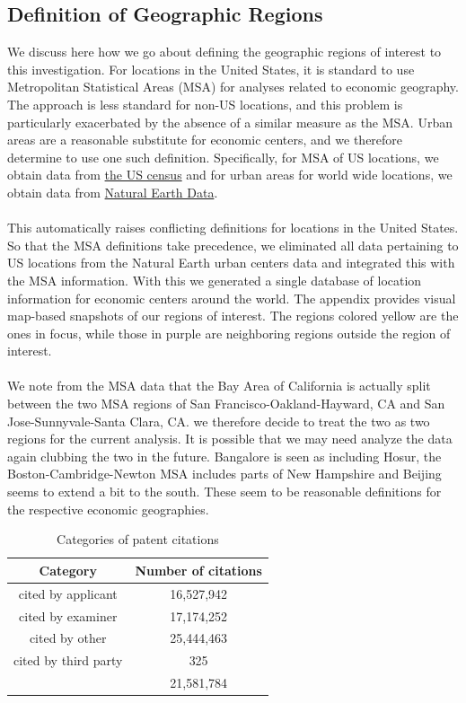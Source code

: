 \documentclass[12pt]{article}
\begin{document}
\subsection{Definition of Geographic Regions}
We discuss here how we go about defining the geographic regions of interest to this investigation.  For locations in the United States, it is standard to use Metropolitan Statistical Areas (MSA) for analyses related to economic geography. The approach is less standard for non-US locations, and this problem is particularly exacerbated by the absence of a similar measure as the MSA. Urban areas are a reasonable substitute for  economic centers, and we therefore determine to use one such definition. Specifically, for MSA of US locations, we obtain data from \href{http://www.census.gov/geo/maps-data/data/cbf/cbf_msa.html}{the US census} and for urban areas for world wide locations, we obtain data from \href{http://www.naturalearthdata.com/downloads/10m-cultural-vectors/}{Natural Earth Data}.
\\\\
This automatically raises conflicting definitions for locations in the United States. So that the MSA definitions take precedence, we eliminated all data pertaining to US locations from the Natural Earth urban centers data and integrated this with the MSA information. With this we  generated a single database of location information for economic centers around the world. The appendix provides visual map-based snapshots of our regions of interest. The regions colored yellow are the ones in focus, while those in purple are neighboring regions outside the region of interest. 
\\\\
We note from the MSA data that the Bay Area of California is actually split between the two MSA regions of San Francisco-Oakland-Hayward, CA and San Jose-Sunnyvale-Santa Clara, CA. we therefore decide to treat the two as two regions for the current analysis. It is possible that we may need analyze the data again clubbing the two in the future. Bangalore is seen as including Hosur, the Boston-Cambridge-Newton MSA includes parts of New Hampshire and Beijing seems to extend a bit to the south.  These seem to be reasonable definitions for the respective economic geographies. 
\begin{table}
\begin{centering}
\caption {Categories of patent citations}
\label{table:uspatentcitation}
\begin{tabular}{|c|c|}
\hline
\textbf{Category}&\textbf{Number of citations}\\\hline
cited by applicant&16,527,942\\\hline
cited by examiner&17,174,252\\\hline
cited by other&25,444,463\\\hline
cited by third party&325\\\hline
&21,581,784\\\hline
\end{tabular}

\end{centering}
\end{table} 
\end{document}
